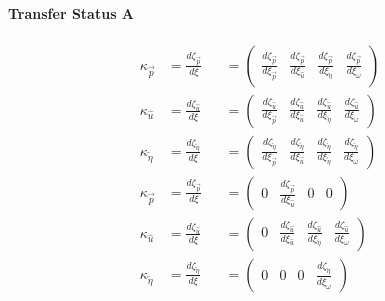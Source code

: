 \documentclass[review]{elsarticle}
\begin{document}
\paragraph{Transfer Status A}
\begin{equation} \begin{alignedat}{-1}
    \kappa_{\vec{p}}&=\frac{d\zeta_{\vec{p}}}{d\xi}&&=\left(\begin{array}{cccc}
        \frac{d\zeta_{\vec{p}}}{d\xi_{\vec{p}}} & \frac{d\zeta_{\vec{p}}}{d\xi_{\hat{u}}} & \frac{d\zeta_{\vec{p}}}{d\xi_{\tilde{\eta}}} & \frac{d\zeta_{\vec{p}}}{d\xi_{\omega}}
    \end{array}\right) \\
    \kappa_{\hat{u}}&=\frac{d\zeta_{\hat{u}}}{d\xi}&&=\left(\begin{array}{cccc}
        \frac{d\zeta_{\hat{u}}}{d\xi_{\vec{p}}} & \frac{d\zeta_{\hat{u}}}{d\xi_{\hat{u}}} & \frac{d\zeta_{\hat{u}}}{d\xi_{\tilde{\eta}}} & \frac{d\zeta_{\hat{u}}}{d\xi_{\omega}}
    \end{array}\right) \\
    \kappa_{\tilde{\eta}}&=\frac{d\zeta_{\tilde{\eta}}}{d\xi}&&=\left(\begin{array}{cccc}
        \frac{d\zeta_{\tilde{\eta}}}{d\xi_{\vec{p}}} & \frac{d\zeta_{\tilde{\eta}}}{d\xi_{\hat{u}}} & \frac{d\zeta_{\tilde{\eta}}}{d\xi_{\tilde{\eta}}} & \frac{d\zeta_{\tilde{\eta}}}{d\xi_{\omega}}
    \end{array}\right) \\
    \kappa_{\vec{p}}&=\frac{d\zeta_{\vec{p}}}{d\xi}&&=\left(\begin{array}{cccc}
        0 & \frac{d\zeta_{\vec{p}}}{d\xi_{\hat{u}}} & 0 & 0 
    \end{array}\right) \\
    \kappa_{\hat{u}}&=\frac{d\zeta_{\hat{u}}}{d\xi}&&=\left(\begin{array}{cccc}
        0 & \frac{d\zeta_{\hat{u}}}{d\xi_{\hat{u}}} & \frac{d\zeta_{\hat{u}}}{d\xi_{\tilde{\eta}}} & \frac{d\zeta_{\hat{u}}}{d\xi_{\omega}}
    \end{array}\right) \\
    \kappa_{\tilde{\eta}}&=\frac{d\zeta_{\tilde{\eta}}}{d\xi}&&=\left(\begin{array}{cccc}
        0 & 0 & 0 & \frac{d\zeta_{\tilde{\eta}}}{d\xi_{\omega}}
    \end{array}\right) \\
\end{alignedat} \end{equation} 
\end{document}
